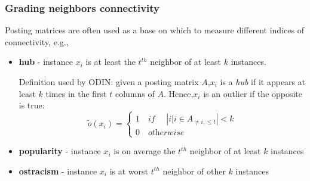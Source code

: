 \subsubsection{Grading neighbors connectivity}
Posting matrices are often used as a base on which
to measure different indices of connectivity, e.g.,
\begin{itemize}
   \item \textbf{hub} - instance $x_i$ is at least the $t^{th}$ neighbor of at least $k$ instances.
   
   Definition used by ODIN: given a posting matrix $A$,$x_i$ is a \textit{hub} if it appears at least $k$ times in the first $t$ columns of $A$. Hence,$x_i$ is an outlier if the opposite is true:
   \[
      \tilde{o}(x_i) = \begin{cases}
         1 \quad\textit{if }\quad |{i|i \in A_{\neq i, \leq t}} | < k\\
         0 \quad\textit{otherwise}
      \end{cases}
   \]
   \item \textbf{popularity} - instance $x_i$ is on average the $t^{th}$ neighbor of at least $k$ instances
   \item \textbf{ostracism} - instance $x_i$ is at worst $t^{th}$ neighbor of other $k$ instances
\end{itemize}